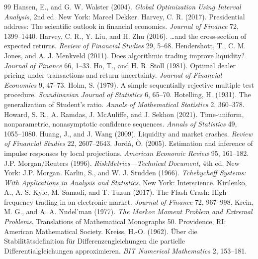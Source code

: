 \documentclass[12pt]{article}
\theoremstyle{definition}
\theoremstyle{remark}
\begin{document}
\begin{thebibliography}{99}
 Hansen, E., and G. W. Walster (2004). \emph{Global Optimization Using Interval Analysis}, 2nd ed. New York: Marcel Dekker.
 Harvey, C. R. (2017). Presidential address: The scientific outlook in financial economics. \emph{Journal of Finance} 72, 1399--1440.
 Harvey, C. R., Y. Liu, and H. Zhu (2016). \ldots and the cross-section of expected returns. \emph{Review of Financial Studies} 29, 5--68.
 Hendershott, T., C. M. Jones, and A. J. Menkveld (2011). Does algorithmic trading improve liquidity? \emph{Journal of Finance} 66, 1--33.
 Ho, T., and H. R. Stoll (1981). Optimal dealer pricing under transactions and return uncertainty. \emph{Journal of Financial Economics} 9, 47--73.
 Holm, S. (1979). A simple sequentially rejective multiple test procedure. \emph{Scandinavian Journal of Statistics} 6, 65--70.
 Hotelling, H. (1931). The generalization of Student's ratio. \emph{Annals of Mathematical Statistics} 2, 360--378.
 Howard, S. R., A. Ramdas, J. McAuliffe, and J. Sekhon (2021). Time-uniform, nonparametric, nonasymptotic confidence sequences. \emph{Annals of Statistics} 49, 1055--1080.
 Huang, J., and J. Wang (2009). Liquidity and market crashes. \emph{Review of Financial Studies} 22, 2607--2643.
 Jord\`a, \`O. (2005). Estimation and inference of impulse responses by local projections. \emph{American Economic Review} 95, 161--182.
 J.P. Morgan/Reuters (1996). \emph{RiskMetrics---Technical Document}, 4th ed. New York: J.P. Morgan.
 Karlin, S., and W. J. Studden (1966). \emph{Tchebycheff Systems: With Applications in Analysis and Statistics}. New York: Interscience.
 Kirilenko, A., A. S. Kyle, M. Samadi, and T. Tuzun (2017). The Flash Crash: High-frequency trading in an electronic market. \emph{Journal of Finance} 72, 967--998.
 Krein, M. G., and A. A. Nudel'man (1977). \emph{The Markov Moment Problem and Extremal Problems}. Translations of Mathematical Monographs 50. Providence, RI: American Mathematical Society.
 Kreiss, H.-O. (1962). \"Uber die Stabilit\"atsdefinition f\"ur Differenzengleichungen die partielle Differentialgleichungen approximieren. \emph{BIT Numerical Mathematics} 2, 153--181.

\end{thebibliography}
\end{document}
